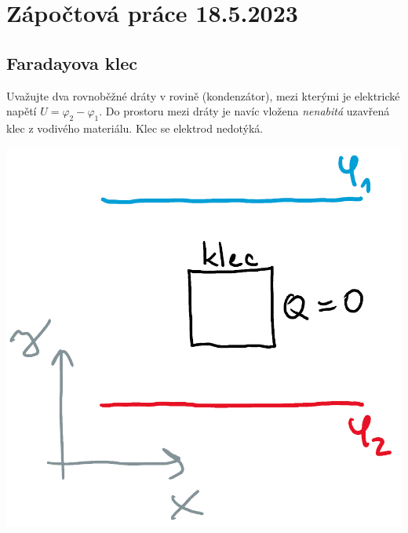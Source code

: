 \documentclass[a4paper,10pt,twoside]{article}
\begin{document}
\section*{Zápočtová práce 18.5.2023}
\subsection*{Faradayova klec}
Uvažujte dva rovnoběžné dráty v rovině (kondenzátor), mezi kterými je elektrické napětí $U=\varphi_{2}-\varphi_{1}$.
Do prostoru mezi dráty je navíc vložena \emph{nenabitá} uzavřená klec z vodivého materiálu.
Klec se elektrod nedotýká.
\begin{center}\includegraphics[width=0.3\linewidth]{klec.png}\end{center}
\end{document}

